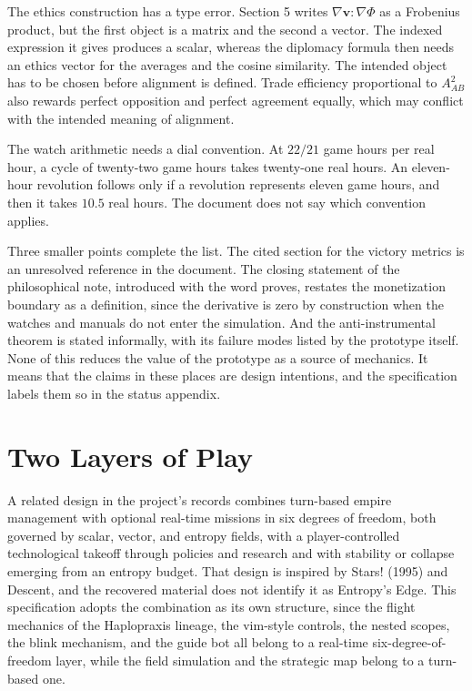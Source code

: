 \documentclass[11pt]{article}
\begin{document}
The ethics construction has a type error. Section 5 writes $\nabla\mathbf{v}:\nabla\Phi$ as a Frobenius product, but the first object is a matrix and the second a vector. The indexed expression it gives produces a scalar, whereas the diplomacy formula then needs an ethics vector for the averages and the cosine similarity. The intended object has to be chosen before alignment is defined. Trade efficiency proportional to $A_{AB}^2$ also rewards perfect opposition and perfect agreement equally, which may conflict with the intended meaning of alignment.

The watch arithmetic needs a dial convention. At $22/21$ game hours per real hour, a cycle of twenty-two game hours takes twenty-one real hours. An eleven-hour revolution follows only if a revolution represents eleven game hours, and then it takes $10.5$ real hours. The document does not say which convention applies.

Three smaller points complete the list. The cited section for the victory metrics is an unresolved reference in the document. The closing statement of the philosophical note, introduced with the word proves, restates the monetization boundary as a definition, since the derivative is zero by construction when the watches and manuals do not enter the simulation. And the anti-instrumental theorem is stated informally, with its failure modes listed by the prototype itself. None of this reduces the value of the prototype as a source of mechanics. It means that the claims in these places are design intentions, and the specification labels them so in the status appendix.

\section{Two Layers of Play}
\label{sec:layers}

A related design in the project's records combines turn-based empire management with optional real-time missions in six degrees of freedom, both governed by scalar, vector, and entropy fields, with a player-controlled technological takeoff through policies and research and with stability or collapse emerging from an entropy budget. That design is inspired by Stars! (1995) and Descent, and the recovered material does not identify it as Entropy's Edge. This specification adopts the combination as its own structure, since the flight mechanics of the Haplopraxis lineage, the vim-style controls, the nested scopes, the blink mechanism, and the guide bot all belong to a real-time six-degree-of-freedom layer, while the field simulation and the strategic map belong to a turn-based one.
\end{document}
